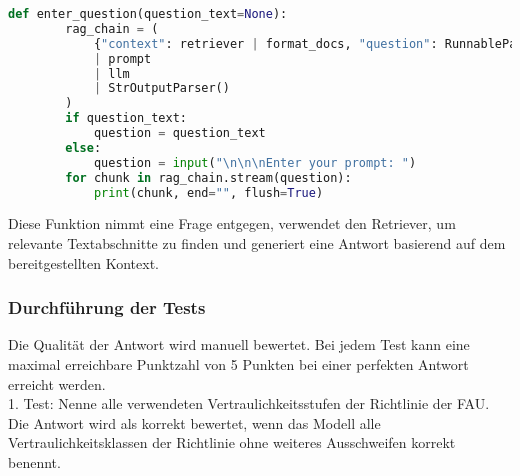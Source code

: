 \documentclass[german,report]{i1thesis}
\begin{document}
\begin{lstlisting}[language=Python]
    def enter_question(question_text=None):
        rag_chain = (
            {"context": retriever | format_docs, "question": RunnablePassthrough()}
            | prompt
            | llm
            | StrOutputParser()
        )
        if question_text:
            question = question_text
        else:
            question = input("\n\n\nEnter your prompt: ")
        for chunk in rag_chain.stream(question):
            print(chunk, end="", flush=True)
    \end{lstlisting}
Diese Funktion nimmt eine Frage entgegen, verwendet den Retriever, um relevante Textabschnitte zu finden und generiert eine Antwort basierend auf dem bereitgestellten Kontext.

\subsubsection{Durchführung der Tests}%
\label{subsec:durchfuehrung-der-tests-rag}

Die Qualität der Antwort wird manuell bewertet.
Bei jedem Test kann eine maximal erreichbare Punktzahl von 5 Punkten bei einer perfekten Antwort erreicht werden.\\

1. Test:
Nenne alle verwendeten Vertraulichkeitsstufen der Richtlinie der \ac{FAU}.\\
Die Antwort wird als korrekt bewertet, wenn das Modell alle Vertraulichkeitsklassen der Richtlinie ohne weiteres Ausschweifen korrekt benennt.
\end{document}
